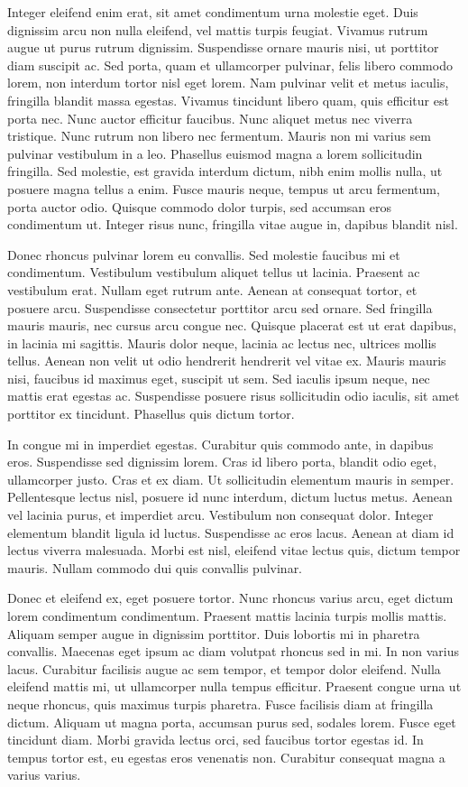 \documentclass[a4paper,twoside,notitlepage,openright,11pt]{report}
\begin{document}
Integer eleifend enim erat, sit amet condimentum urna molestie eget. Duis dignissim arcu non nulla eleifend, vel mattis turpis feugiat. Vivamus rutrum augue ut purus rutrum dignissim. Suspendisse ornare mauris nisi, ut porttitor diam suscipit ac. Sed porta, quam et ullamcorper pulvinar, felis libero commodo lorem, non interdum tortor nisl eget lorem. Nam pulvinar velit et metus iaculis, fringilla blandit massa egestas. Vivamus tincidunt libero quam, quis efficitur est porta nec. Nunc auctor efficitur faucibus. Nunc aliquet metus nec viverra tristique. Nunc rutrum non libero nec fermentum. Mauris non mi varius sem pulvinar vestibulum in a leo. Phasellus euismod magna a lorem sollicitudin fringilla. Sed molestie, est gravida interdum dictum, nibh enim mollis nulla, ut posuere magna tellus a enim. Fusce mauris neque, tempus ut arcu fermentum, porta auctor odio. Quisque commodo dolor turpis, sed accumsan eros condimentum ut. Integer risus nunc, fringilla vitae augue in, dapibus blandit nisl.

Donec rhoncus pulvinar lorem eu convallis. Sed molestie faucibus mi et condimentum. Vestibulum vestibulum aliquet tellus ut lacinia. Praesent ac vestibulum erat. Nullam eget rutrum ante. Aenean at consequat tortor, et posuere arcu. Suspendisse consectetur porttitor arcu sed ornare. Sed fringilla mauris mauris, nec cursus arcu congue nec. Quisque placerat est ut erat dapibus, in lacinia mi sagittis. Mauris dolor neque, lacinia ac lectus nec, ultrices mollis tellus. Aenean non velit ut odio hendrerit hendrerit vel vitae ex. Mauris mauris nisi, faucibus id maximus eget, suscipit ut sem. Sed iaculis ipsum neque, nec mattis erat egestas ac. Suspendisse posuere risus sollicitudin odio iaculis, sit amet porttitor ex tincidunt. Phasellus quis dictum tortor.

In congue mi in imperdiet egestas. Curabitur quis commodo ante, in dapibus eros. Suspendisse sed dignissim lorem. Cras id libero porta, blandit odio eget, ullamcorper justo. Cras et ex diam. Ut sollicitudin elementum mauris in semper. Pellentesque lectus nisl, posuere id nunc interdum, dictum luctus metus. Aenean vel lacinia purus, et imperdiet arcu. Vestibulum non consequat dolor. Integer elementum blandit ligula id luctus. Suspendisse ac eros lacus. Aenean at diam id lectus viverra malesuada. Morbi est nisl, eleifend vitae lectus quis, dictum tempor mauris. Nullam commodo dui quis convallis pulvinar.

Donec et eleifend ex, eget posuere tortor. Nunc rhoncus varius arcu, eget dictum lorem condimentum condimentum. Praesent mattis lacinia turpis mollis mattis. Aliquam semper augue in dignissim porttitor. Duis lobortis mi in pharetra convallis. Maecenas eget ipsum ac diam volutpat rhoncus sed in mi. In non varius lacus. Curabitur facilisis augue ac sem tempor, et tempor dolor eleifend. Nulla eleifend mattis mi, ut ullamcorper nulla tempus efficitur. Praesent congue urna ut neque rhoncus, quis maximus turpis pharetra. Fusce facilisis diam at fringilla dictum. Aliquam ut magna porta, accumsan purus sed, sodales lorem. Fusce eget tincidunt diam. Morbi gravida lectus orci, sed faucibus tortor egestas id. In tempus tortor est, eu egestas eros venenatis non. Curabitur consequat magna a varius varius.
\end{document}
